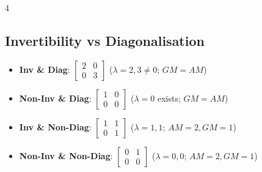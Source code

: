 \documentclass[9pt]{extarticle}
\begin{document}
\begin{multicols*}{4}
\subsection*{Invertibility vs Diagonalisation}
\begin{itemize}
    \item \textbf{Inv \& Diag}: $\left[\begin{smallmatrix}2&0\\ 0&3\end{smallmatrix}\right]$ ($\lambda=2,3 \neq 0$; $GM=AM$)
    \item \textbf{Non-Inv \& Diag}: $\left[\begin{smallmatrix}1&0\\ 0&0\end{smallmatrix}\right]$ ($\lambda=0$ exists; $GM=AM$)
    \item \textbf{Inv \& Non-Diag}: $\left[\begin{smallmatrix}1&1\\ 0&1\end{smallmatrix}\right]$ ($\lambda=1,1$; $AM=2, GM=1$)
    \item \textbf{Non-Inv \& Non-Diag}: $\left[\begin{smallmatrix}0&1\\ 0&0\end{smallmatrix}\right]$ ($\lambda=0,0$; $AM=2, GM=1$)
\end{itemize}



\end{multicols*}
\end{document}
